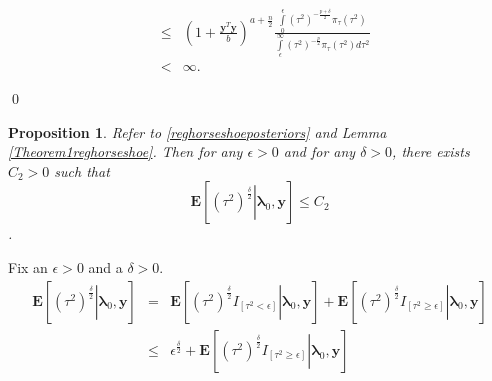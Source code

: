 \documentclass[noinfoline,11pt]{imsart}
\numberwithin{equation}{section}
\theoremstyle{plain}
\newtheorem{prop}{Proposition}[section]
\newcommand{\y}{\mathbf{y}}
\newcommand{\bl}{\boldsymbol{\lambda}}
\newcommand{\E}{\boldsymbol{E}}
\begin{document}
\begin{eqnarray}
 &\leq& \left(1+\frac{\y^T\y}{b}\right)^{a+\frac{n}{2}}\frac{\int\limits_0^{\epsilon}\left(\tau^2\right)^{-\frac{p+\delta}{2}}\pi_\tau\left(\tau^2\right)}{\int\limits_\epsilon^\infty\left(\tau^2\right)^{-\frac{p}{2}} \pi_\tau\left(\tau^2\right)d\tau^2} \nonumber\\
&<& \infty. 
\end{eqnarray}

\noindent
\qed

\begin{prop}\label{reghsupperboundontau^2}
Refer to \ref{reghorseshoeposteriors} and Lemma \ref{Theorem1reghorseshoe}. Then for any $\epsilon>0$ and for any $\delta>0$, there exists $C_2>0$ such that  $$\E\left[\left.\left(\tau^2\right)^{\frac{\delta}{2}}\right|\bl_0,\y\right]\leq C_2$$.
\end{prop}

\proof Fix an $\epsilon>0$ and a $\delta>0$. \\
\begin{eqnarray}\label{reghsupperboundtau^2:1}
 \E\left[\left.\left(\tau^2\right)^{\frac{\delta}{2}}\right| \bl_0,\y\right]&=&\E\left[\left.\left(\tau^2\right)^{\frac{\delta}{2}}I_{\left[\tau^2<\epsilon\right]}\right| \bl_0,\y\right]+\E\left[\left.\left(\tau^2\right)^{\frac{\delta}{2}}I_{\left[\tau^2\geq\epsilon\right]}\right| \bl_0,\y\right]\nonumber \\
&\leq & \epsilon^{\frac{\delta}{2}}+\E\left[\left.\left(\tau^2\right)^{\frac{\delta}{2}}I_{\left[\tau^2\geq\epsilon\right]}\right| \bl_0,\y\right] \nonumber \\
\end{eqnarray}
\end{document}
